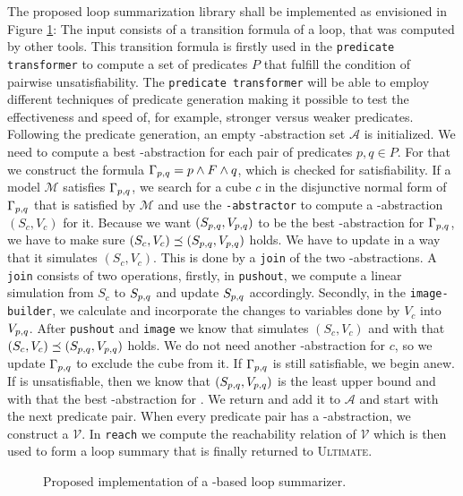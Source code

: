 
The proposed \qvasrs loop summarization library shall be implemented as envisioned in Figure \ref{fig}: The input consists of a transition formula of a loop, that was computed by other tools. This transition formula is firstly used in the \texttt{predicate transformer} to compute a set of predicates $P$ that fulfill the condition of pairwise unsatisfiability. The \texttt{predicate transformer} will be able to employ different techniques of predicate generation making it possible to test the effectiveness and speed of, for example, stronger versus weaker predicates. Following the predicate generation, an empty \qvasr-abstraction set $\mathcal{A}$ is initialized. We need to compute a best \qvasr-abstraction \pqvasr for each pair of predicates $p, q \in P$. For that we construct the formula $\Gamma_{p, q} = p \land F \land q$, which is checked for satisfiability. If a model $\mathcal{M}$ satisfies $\Gamma_{p, q}$, we search for a cube $c$ in the disjunctive normal form of $\Gamma_{p, q}$ that is satisfied by $\mathcal{M}$ and use the \texttt{\qvasr-abstractor} to compute a \qvasr-abstraction $(S_c, V_c)$ for it. Because we want $(S_{p, q}, V_{p, q})$ to be the best \qvasr-abstraction for $\Gamma_{p, q}$, we have to make sure $(S_c, V_c) \preceq (S_{p, q}, V_{p, q})$ holds. We have to update \pqvasr in a way that it simulates $(S_c, V_c)$. This is done by a \texttt{join} of the two \qvasr-abstractions. A \texttt{join} consists of two operations, firstly, in \texttt{pushout}, we compute a linear simulation from $S_c$ to $S_{p, q}$ and update $S_{p, q}$ accordingly. Secondly, in the \texttt{image-builder}, we calculate and incorporate the changes to variables done by $V_c$ into $V_{p, q}$. After \texttt{pushout} and \texttt{image} we know that \pqvasr simulates $(S_c, V_c)$ and with that $(S_c, V_c) \preceq (S_{p, q}, V_{p, q})$ holds. We do not need another \qvasr-abstraction for $c$, so we update $\Gamma_{p, q}$ to exclude the cube from it. If $\Gamma_{p, q}$ is still satisfiable, we begin anew.
If \pqformula is unsatisfiable, then we know that $(S_{p, q}, V_{p, q})$ is the least upper bound and with that the best \qvasr-abstraction for \pqformula. We return and add it to $\mathcal{A}$ and start with the next predicate pair. When every predicate pair has a \qvasr-abstraction, we construct a \qvasrs $\mathcal{V}$. In \texttt{reach} we compute the reachability relation of $\mathcal{V}$ which is then used to form a loop summary that is finally returned to \textsc{Ultimate}.
\begin{figure}[H]
    
    \caption{Proposed implementation of a \qvasrs-based loop summarizer.}
    \label{fig}
\end{figure}

